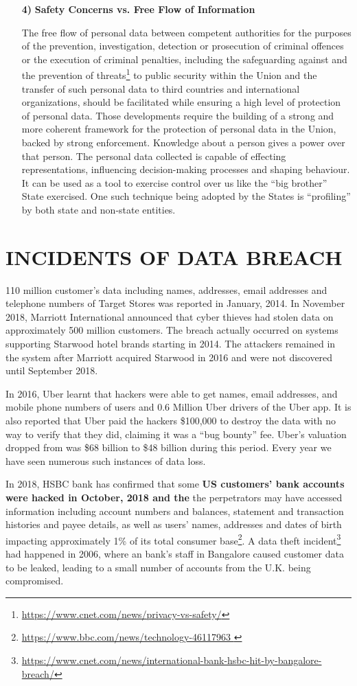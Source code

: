 \begin{multicols}{2}
\begin{itemize}
\item[{\bf 4)}] \textbf{Safety Concerns vs. Free Flow of Information}

The free flow of personal data between competent authorities for the purposes of the prevention, investigation, detection or prosecution of criminal offences or the execution of criminal penalties, including the safeguarding against and the prevention of threats\footnote{\url{https://www.cnet.com/news/privacy-vs-safety/}} to public security within the Union and the transfer of such personal data to third countries and international organizations, should be facilitated while ensuring a high level of protection of personal data. Those developments require the building of a strong and more coherent framework for the protection of personal data in the Union, backed by strong enforcement.  Knowledge about a person gives a power over that person. The personal data collected is capable of effecting representations, influencing decision-making processes and shaping behaviour. It can be used as a tool to exercise control over us like the “big brother” State exercised. One such technique being adopted by the States is “profiling” by both state and non-state entities. 
\end{itemize}

\section{INCIDENTS OF DATA BREACH}

110 million customer’s data including names, addresses, email addresses and telephone numbers of Target Stores was reported in January, 2014. In November 2018, Marriott International announced that cyber thieves had stolen data on approximately 500 million customers. The breach actually occurred on systems supporting Starwood hotel brands starting in 2014. The attackers remained in the system after Marriott acquired Starwood in 2016 and were not discovered until September 2018.

In 2016, Uber learnt that hackers were able to get names, email addresses, and mobile phone numbers of users and 0.6 Million Uber drivers of the Uber app. It is also reported that Uber paid the hackers \$100,000 to destroy the data with no way to verify that they did, claiming it was a “bug bounty” fee. Uber’s valuation dropped from was \$68 billion to \$48 billion during this period. Every year we have seen numerous such instances of data loss. 

In 2018, HSBC bank has confirmed that some \textbf{US customers' bank accounts were hacked in October, 2018 and the} the perpetrators may have accessed information including account numbers and balances, statement and transaction histories and payee details, as well as users' names, addresses and dates of birth impacting approximately 1\% of its total consumer base\footnote{\url{https://www.bbc.com/news/technology-46117963 }}. A data theft incident\footnote{\url{https://www.cnet.com/news/international-bank-hsbc-hit-by-bangalore-breach/}} had happened in 2006, where an bank’s staff in Bangalore caused customer data to be leaked, leading to a small number of accounts from the U.K. being compromised.


\end{multicols}
